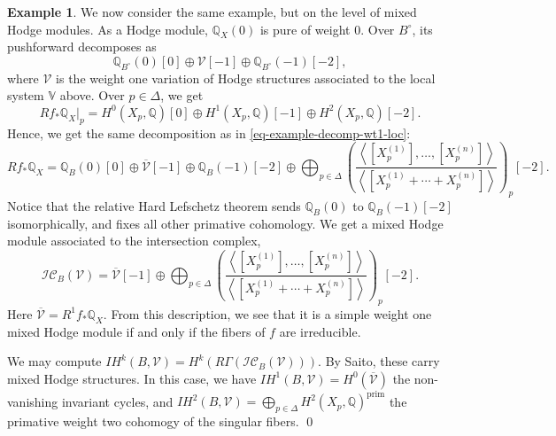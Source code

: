 \documentclass[12pt]{amsart}
\newcommand{\Q}{\mathbb{Q}}
\newcommand{\ol}{\overline}
\theoremstyle{definition}
\newtheorem{example}[theorem]{Example}
\theoremstyle{remark}
\numberwithin{equation}{section}
\begin{document}
\begin{example}
We now consider the same example, but on the level of mixed Hodge modules. As a Hodge
module, \(\Q_X(0)\) is pure of weight 0. Over \(B^\circ\), its pushforward 
decomposes as 
\begin{equation}
    \Q_{B^\circ}(0)[0] \oplus \mathcal{V}[-1] \oplus \Q_{B^\circ}(-1)[-2],
\end{equation}
where \(\mathcal{V}\) is the weight one variation of Hodge structures associated to the 
local system \(\mathbb{V}\) above. Over \(p \in \Delta\), we get 
\begin{equation}
    Rf_* \Q_X|_p = H^0(X_p, \Q)[0] \oplus H^1(X_p, \Q)[-1] \oplus H^2(X_p, \Q)[-2].
\end{equation}
Hence, we get the same decomposition as in \eqref{eq-example-decomp-wt1-loc}: 
\begin{equation}
   Rf_* \Q_X = \Q_B(0)[0] \oplus \ol{\mathcal{V}}[-1] \oplus \Q_B(-1)[-2] \oplus
   \bigoplus_{p \in \Delta} \left(\frac{\left<[X_p^{(1)}], \dots, [X_p^{(n)}]\right>}
   {\left<[X_p^{(1)} + \cdots + X_p^{(n)}]\right>}\right)_p[-2].
\end{equation}
Notice that the relative Hard Lefschetz theorem sends \(\Q_B(0)\) to \(\Q_B(-1)[-2]\)
isomorphically, and fixes all other primative cohomology. We get a mixed Hodge module 
associated to the intersection complex, 
\begin{equation}
    \mathscr{IC}_B(\mathcal{V}) = \ol{\mathcal{V}}[-1] \oplus 
    \bigoplus_{p \in \Delta} \left(\frac{\left<[X_p^{(1)}], \dots, [X_p^{(n)}]\right>}
   {\left<[X_p^{(1)} + \cdots + X_p^{(n)}]\right>}\right)_p[-2].
\end{equation}
Here \(\ol{\mathcal{V}} = R^1 f_* \Q_X\). From this description, we see that it is a
simple weight one mixed Hodge module if and only if the fibers of \(f\) are irreducible.

We may compute \(IH^k(B, \mathcal{V}) = H^k(R \Gamma(\mathscr{IC}_B(\mathcal{V})))\).
By Saito, these carry mixed Hodge structures. In this case, we have 
\(IH^1(B, \mathcal{V}) = H^0(\ol{\mathcal{V}})\) the non-vanishing invariant cycles, and
\(IH^2(B, \mathcal{V}) = \bigoplus_{p \in \Delta} H^2(X_p, \Q)^{\mathrm{prim}}\)
the primative weight two cohomogy of the singular fibers.
\qed
\end{example}





\end{document}
